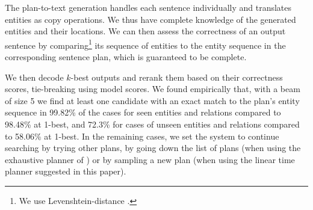 \documentclass[11pt,a4paper,table,xcdraw]{article}
\begin{document}
The plan-to-text generation handles each sentence individually and translates entities as copy operations. We thus have complete knowledge of the generated entities and their locations. We can then assess the correctness of an output sentence by comparing\footnote{We use 
Levenshtein-distance \cite{levenshtein1966binary}.} its sequence of entities to the entity sequence in the corresponding sentence plan, which is guaranteed to be complete.%

We then decode $k$-best outputs and rerank them based on their correctness scores, tie-breaking using model scores. We found empirically that, with a beam of size 5 we find at least one candidate with an exact match to the plan's entity sequence in 99.82\% of the cases for seen entities and relations compared to 98.48\% at 1-best, and 72.3\% for cases of unseen entities and relations compared to 58.06\% at 1-best. In the remaining cases, we set the system to continue searching by trying other plans, by going down the list of plans (when using the exhaustive planner of \citet{step-by-step}) or by sampling a new plan (when using the linear time planner suggested in this paper).

\end{document}
